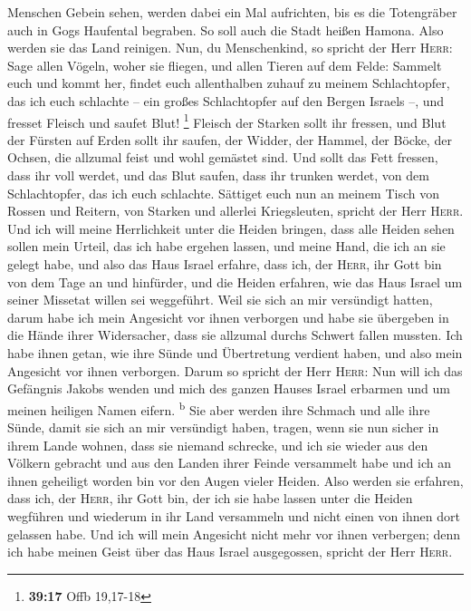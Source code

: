 Menschen Gebein sehen, werden dabei ein Mal aufrichten, bis es die
Totengräber auch in Gogs Haufental begraben.  So soll
auch die Stadt heißen Hamona. Also werden sie das Land reinigen.
 Nun, du Menschenkind, so spricht der Herr \textsc{Herr}:
Sage allen Vögeln, woher sie fliegen, und allen Tieren auf dem Felde:
Sammelt euch und kommt her, findet euch allenthalben zuhauf zu meinem
Schlachtopfer, das ich euch schlachte -- ein großes Schlachtopfer auf
den Bergen Israels --, und fresset Fleisch und saufet Blut! \footnote{\textbf{39:17}
  Offb 19,17-18}  Fleisch der Starken sollt ihr fressen,
und Blut der Fürsten auf Erden sollt ihr saufen, der Widder, der Hammel,
der Böcke, der Ochsen, die allzumal feist und wohl gemästet sind.
 Und sollt das Fett fressen, dass ihr voll werdet, und
das Blut saufen, dass ihr trunken werdet, von dem Schlachtopfer, das ich
euch schlachte.  Sättiget euch nun an meinem Tisch von
Rossen und Reitern, von Starken und allerlei Kriegsleuten, spricht der
Herr \textsc{Herr}.  Und ich will meine Herrlichkeit
unter die Heiden bringen, dass alle Heiden sehen sollen mein Urteil, das
ich habe ergehen lassen, und meine Hand, die ich an sie gelegt habe,
 und also das Haus Israel erfahre, dass ich, der
\textsc{Herr}, ihr Gott bin von dem Tage an und hinfürder,
 und die Heiden erfahren, wie das Haus Israel um seiner
Missetat willen sei weggeführt. Weil sie sich an mir versündigt hatten,
darum habe ich mein Angesicht vor ihnen verborgen und habe sie übergeben
in die Hände ihrer Widersacher, dass sie allzumal durchs Schwert fallen
mussten.  Ich habe ihnen getan, wie ihre Sünde und
Übertretung verdient haben, und also mein Angesicht vor ihnen verborgen.
 Darum so spricht der Herr \textsc{Herr}: Nun will ich
das Gefängnis Jakobs wenden und mich des ganzen Hauses Israel erbarmen
und um meinen heiligen Namen eifern. \textsuperscript{b} 
Sie aber werden ihre Schmach und alle ihre Sünde, damit sie sich an mir
versündigt haben, tragen, wenn sie nun sicher in ihrem Lande wohnen,
dass sie niemand schrecke,  und ich sie wieder aus den
Völkern gebracht und aus den Landen ihrer Feinde versammelt habe und ich
an ihnen geheiligt worden bin vor den Augen vieler Heiden.
 Also werden sie erfahren, dass ich, der \textsc{Herr},
ihr Gott bin, der ich sie habe lassen unter die Heiden wegführen und
wiederum in ihr Land versammeln und nicht einen von ihnen dort gelassen
habe.  Und ich will mein Angesicht nicht mehr vor ihnen
verbergen; denn ich habe meinen Geist über das Haus Israel ausgegossen,
spricht der Herr \textsc{Herr}.

